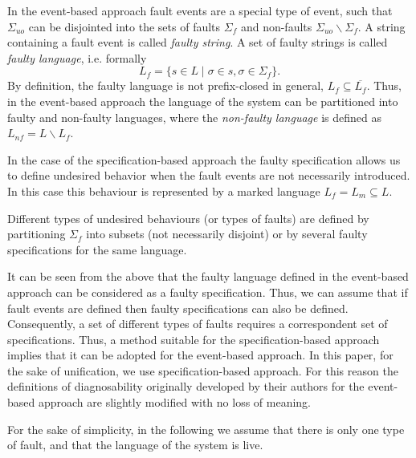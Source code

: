 \documentclass[a4paper, 10pt, conference]{ieeeconf}
\begin{document}
In the event-based approach fault events are a special type of event, such that
$\Sigma_{uo}$ can be disjointed into the sets of faults $\Sigma_f$ and
non-faults $\Sigma_{uo}\backslash \Sigma_f$. A string containing a fault event
is called \emph{faulty string}. A set of faulty strings is called \emph{faulty
language}, i.e. formally $$L_f = \{ s \in L \mid \sigma \in s, \sigma \in
\Sigma_f\}.$$ By definition, the faulty language is not prefix-closed in
general, $L_f \subseteq \overline{L_f}$. Thus, in the event-based approach the
language of the system can be partitioned into faulty and non-faulty languages,
where the \emph{non-faulty language} is defined as $L_{nf} = L \backslash L_f$.

In the case of the specification-based approach the faulty specification allows
us to define undesired behavior when the fault events are not necessarily
introduced. In this case this behaviour is represented by a marked language $L_f
= L_m \subseteq L$. 

Different types of undesired behaviours (or types of faults) are defined by
partitioning $\Sigma_f$ into subsets (not necessarily disjoint) or by several
faulty specifications for the same language. 

It can be seen from the above that the faulty language defined in the
event-based approach can be considered as a faulty specification. Thus, we can
assume that if fault events are defined then faulty specifications can also be
defined. Consequently, a set of different types of faults requires a
correspondent set of specifications. Thus, a method suitable for the
specification-based approach implies that it can be adopted for the event-based
approach. In this paper, for the sake of unification, we use specification-based
approach. For this reason the definitions of diagnosability originally developed
by their authors for the event-based approach are slightly modified with no loss
of meaning. 

For the sake of simplicity, in the following we assume that there is only one
type of fault, and that the language of the system is live.



\end{document}
